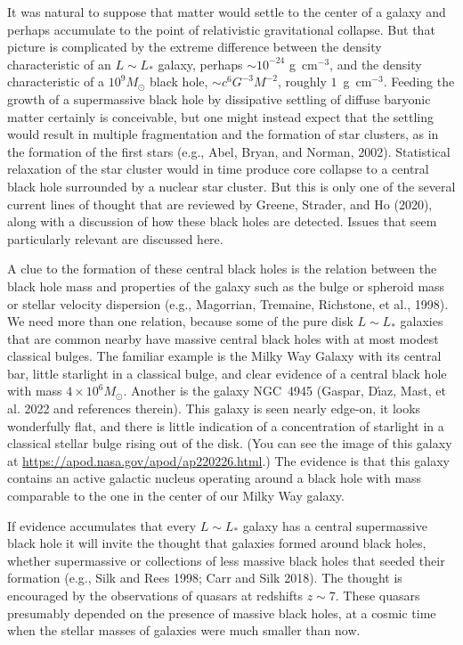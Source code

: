 \documentclass[fleqn,12pt]{article}
\begin{document}
It was natural to suppose that matter would settle to the center of a galaxy and perhaps accumulate to the point of relativistic gravitational collapse. But that picture is complicated by the extreme difference between the density characteristic of an $L\sim L_\ast$ galaxy, perhaps $\sim 10^{-24}$ g~cm$^{-3}$, and the density characteristic of a $10^{9} M_\odot$ black hole, $\sim c^6G^{-3}M^{-2}$, roughly $1$~g~cm$^{-3}$. Feeding the growth of a supermassive black hole by dissipative settling of diffuse baryonic matter certainly is conceivable, but one might instead expect that the settling would result in multiple fragmentation and the formation of star clusters, as in the formation of the first stars (e.g., Abel, Bryan, and Norman, 2002). Statistical relaxation of the star cluster would in time produce core collapse to a central black hole surrounded by a nuclear star cluster. But this is only one of the several current lines of thought that are reviewed by Greene, Strader, and Ho (2020), along with a discussion of how these black holes are detected. Issues that seem particularly relevant are discussed here.

A clue to the formation of these central black holes is the relation between the  black hole mass and properties of the galaxy such as the bulge or spheroid mass or stellar velocity dispersion (e.g., Magorrian, Tremaine, Richstone, et al., 1998). We need more than one relation, because some of the pure disk $L\sim L_\ast$ galaxies that are common nearby have massive central black holes with at most modest classical bulges. The familiar example is the Milky Way Galaxy with its central bar, little starlight in a classical bulge, and clear evidence of a central black hole with mass $4\times 10^6 M_\odot$. Another is the galaxy NGC~4945 (Gaspar, D{\'\i}az, Mast, et al. 2022 and references therein). This galaxy is seen nearly edge-on, it looks wonderfully flat, and there is little indication of a concentration of starlight in a classical stellar bulge rising out of the disk. (You can see the image of this galaxy at \url{https://apod.nasa.gov/apod/ap220226.html}.) The evidence is that this galaxy contains an active galactic nucleus operating around a black hole with mass comparable to the one in the center of our Milky Way galaxy.

If evidence accumulates that every $L\sim L_\ast$ galaxy has a central supermassive black hole it will invite the thought that galaxies formed around black holes, whether supermassive or collections of less massive black holes that seeded their formation (e.g., Silk and Rees 1998; Carr and Silk 2018). The thought is encouraged by the observations of quasars at redshifts $z\sim 7$. These quasars presumably depended on the presence of massive black holes, at a cosmic time when the stellar masses of galaxies were much smaller than now. 
\end{document}
